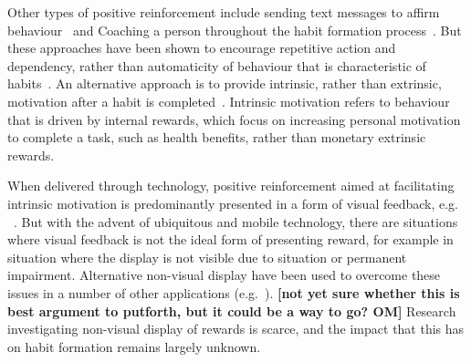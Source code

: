 \documentclass{scaffold/sigchi}
\begin{document}
%

Other types of positive reinforcement include sending text messages to affirm behaviour~\cite{chi_crowd_designed_motivation} and Coaching a person throughout the habit formation process~\cite{coaching_not_that_good}. But these approaches have been shown to encourage repetitive action and dependency, rather than automaticity of behaviour that is characteristic of habits~\cite{habits_as_automaticity_not_frequency_gardner}.
%
An alternative approach is to provide intrinsic, rather than extrinsic, motivation after a habit is completed~\cite{article_a_self_efficacy, article_meta_analytic_review_intrinsic_motivation}. Intrinsic motivation refers to behaviour that is driven by internal rewards, which focus on increasing personal motivation to complete a task, such as health benefits, rather than monetary extrinsic rewards.

When delivered through technology, positive reinforcement aimed at facilitating intrinsic motivation is predominantly presented in a form of visual feedback, e.g. %
~\cite{comparison_of_auditory_visual_feedback, visual_mode_better, article_realtime_feedback_improving_medication_taking}. 
%
But with the advent of ubiquitous and mobile technology, there are situations where visual feedback is not the ideal form of presenting reward, for example in situation where the display is not visible due to situation or permanent impairment. Alternative non-visual display have been used to overcome these issues in a number of other applications (e.g.~\cite{burke2006comparing, vazquez2012auditory, chi_oussama_tap_the_shapetones}). 
\textbf{[not yet sure whether this is best argument to putforth, but it could be a way to go? OM]}
Research investigating non-visual display of rewards is scarce, and the impact that this has on habit formation remains largely unknown.


%
%
\end{document}
